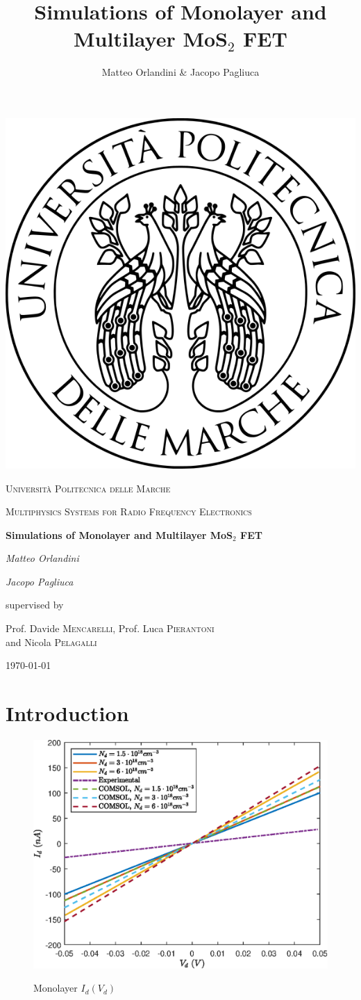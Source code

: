 \documentclass[12pt,a4paper,titlepage]{article}
\title{Simulations of Monolayer and Multilayer MoS$_2$ FET}
\author{Matteo Orlandini \& Jacopo Pagliuca}
\date{}
\newcommand{\CoverName}{Cover}
\begin{document}
\renewcommand{\thepage}{\CoverName}
\begin{titlepage}
	
	\centering
	\includegraphics[width=.2\textwidth]{Immagini/univpmlogo}\par\vspace{1cm}
	{\scshape\LARGE Università Politecnica delle Marche\par}
	\vspace{1cm}
	{\scshape\Large Multiphysics Systems for Radio Frequency Electronics\par}
	\vspace{1.5cm}
	{\huge\bfseries  Simulations of Monolayer and Multilayer MoS$_2$ FET \par}
	\vspace{2cm}
	{\Large\itshape Matteo Orlandini \par}
	{\Large\itshape Jacopo Pagliuca\par}
	\vfill
	supervised by\par
	Prof. Davide \textsc{Mencarelli}, Prof. Luca \textsc{Pierantoni}\\ and Nicola \textsc{Pelagalli}
	
	\vfill
	
	{\large \today\par}
\end{titlepage}

\thispagestyle{empty}
\tableofcontents

\newpage
{}
\setcounter{page}{1}
\section{Introduction}

\begin{figure}[H]
	\centering
	\includegraphics[width=1\textwidth]{Grafici/monolayer_Id(Vd).eps} 
	\label{fig:monolayer_Id(Vd))}
	\caption{Monolayer $I_d(V_d)$}
\end{figure}
\end{document}
